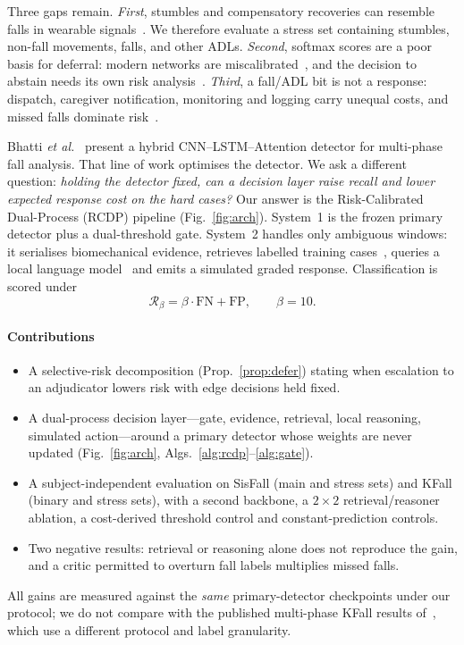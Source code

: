\documentclass[journal]{IEEEtran}
\begin{document}
Three gaps remain. \emph{First}, stumbles and compensatory recoveries can resemble falls in wearable signals~\cite{aziz2016fall,aziz2012nearfall,aziz2014causes}. We therefore evaluate a stress set containing stumbles, non-fall movements, falls, and other ADLs. \emph{Second}, softmax scores are a poor basis for deferral: modern networks are miscalibrated~\cite{guo2017calibration,lakshminarayanan2017ensembles}, and the decision to abstain needs its own risk analysis~\cite{chow1970reject,el2010foundations,geifman2017selective,cortes2016rejection}. \emph{Third}, a fall/ADL bit is not a response: dispatch, caregiver notification, monitoring and logging carry unequal costs, and missed falls dominate risk~\cite{elkan2001foundations,noury2008evaluation}.

Bhatti \textit{et al.}~\cite{bhatti2025beyond} present a hybrid CNN--LSTM--Attention detector for multi-phase fall analysis. That line of work optimises the detector. We ask a different question: \emph{holding the detector fixed, can a decision layer raise recall and lower expected response cost on the hard cases?} Our answer is the Risk-Calibrated Dual-Process (RCDP) pipeline (Fig.~\ref{fig:arch}). System~1 is the frozen primary detector plus a dual-threshold gate. System~2 handles only ambiguous windows: it serialises biomechanical evidence, retrieves labelled training cases~\cite{minilm2020,lewis2020rag}, queries a local language model~\cite{wei2022cot,yao2023react,ollama,mistral2023} and emits a simulated graded response. Classification is scored under
\begin{equation}
\mathcal{R}_\beta = \beta\cdot\mathrm{FN}+\mathrm{FP},\qquad \beta=10.
\label{eq:risk}
\end{equation}

\paragraph{Contributions}
\begin{itemize}
\item A selective-risk decomposition (Prop.~\ref{prop:defer}) stating when escalation to an adjudicator lowers risk with edge decisions held fixed.
\item A dual-process decision layer---gate, evidence, retrieval, local reasoning, simulated action---around a primary detector whose weights are never updated (Fig.~\ref{fig:arch}, Algs.~\ref{alg:rcdp}--\ref{alg:gate}).
\item A subject-independent evaluation on SisFall (main and stress sets) and KFall (binary and stress sets), with a second backbone, a $2{\times}2$ retrieval/reasoner ablation, a cost-derived threshold control and constant-prediction controls.
\item Two negative results: retrieval or reasoning alone does not reproduce the gain, and a critic permitted to overturn fall labels multiplies missed falls.
\end{itemize}
All gains are measured against the \emph{same} primary-detector checkpoints under our protocol; we do not compare with the published multi-phase KFall results of~\cite{bhatti2025beyond}, which use a different protocol and label granularity.
\end{document}
